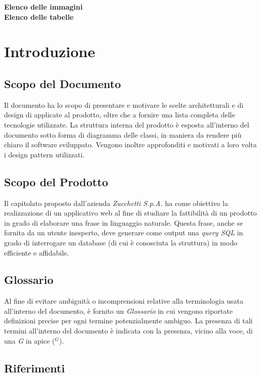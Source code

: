 \documentclass[5pt]{article}
\begin{document}
	\pagebreak
	\tableofcontents
	\pagebreak
	\textbf{\Large Elenco delle immagini} \\
	
	\pagebreak
	\textbf{\Large Elenco delle tabelle} \\
	\makeatletter
	\makeatother
	\pagebreak
	
	\section{Introduzione}
	
	\subsection{Scopo del Documento}

    Il documento ha lo scopo di presentare e motivare le scelte architetturali e di design di applicate al prodotto, oltre che a fornire una lista completa delle tecnologie utilizzate. La struttura interna del prodotto è esposta all'interno del documento sotto forma di diagramma delle classi, in maniera da rendere più chiaro il software sviluppato. Vengono inoltre approfonditi e motivati a loro volta i design pattern utilizzati. 
	
	\subsection{Scopo del Prodotto}
    Il capitolato proposto dall'azienda \textit{Zucchetti S.p.A.} ha come obiettivo la realizzazione di un applicativo web al fine di studiare la fattibilità di un prodotto in grado di elaborare una frase in linguaggio naturale. Questa frase, anche se fornita da un utente inesperto, deve generare come output una \textit{query SQL} in grado di interrogare un database (di cui è conosciuta la struttura) in modo efficiente e affidabile.
	
	\subsection{Glossario}
    Al fine di evitare ambiguità o incomprensioni relative alla terminologia usata all'interno del documento, è fornito un \textit{Glossario} in cui vengono riportate definizioni precise per ogni termine potenzialmente ambiguo. La presenza di tali termini all'interno del documento è indicata con la presenza, vicino alla voce, di una \textit{G} in apice ($^G$). 
	\subsection{Riferimenti}
	
\end{document}
